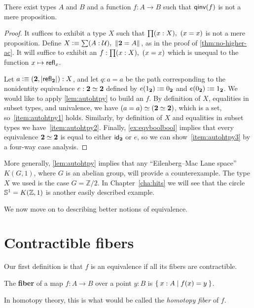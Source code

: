 \begin{thm}
  There exist types $A$ and $B$ and a function $f:A\to B$ such that $\qinv(f)$ is not a mere proposition.
\end{thm}
\begin{proof}
  It suffices to exhibit a type $X$ such that $\prd{x:X} (x=x)$ is not a mere proposition.
  Define $X\defeq \sm{A:\type} \brck{\bool=A}$, as in the proof of \autoref{thm:no-higher-ac}.
  It will suffice to exhibit an $f:\prd{x:X} (x=x)$ which is unequal to the function $x\mapsto \refl{x}$.

  Let $a \defeq (\bool,\bproj{\refl{\bool}}) : X$, and let $q:a=a$ be the path corresponding to the nonidentity equivalence $e:\eqv\bool\bool$ defined by $e(\btrue)\defeq\bfalse$ and $e(\bfalse)\defeq\btrue$.
  We would like to apply \autoref{lem:autohtpy} to build an $f$.
  By definition of $X$, equalities in subset types, and univalence, we have $\eqv{(a=a)}{(\eqv{\bool}{\bool})}$, which is a set, so~\ref{item:autohtpy1} holds.
  Similarly, by definition of $X$ and equalities in subset types we have~\ref{item:autohtpy2}.
  Finally, \autoref{ex:eqvboolbool} implies that every equivalence $\eqv\bool\bool$ is equal to either $\idfunc[\bool]$ or $e$, so we can show~\ref{item:autohtpy3} by a four-way case analysis.
\end{proof}

More generally, \autoref{lem:autohtpy} implies that any ``Eilenberg--Mac Lane space'' $K(G,1)$, where $G$ is an abelian group, will provide a counterexample.
The type $X$ we used is the case $G = \mathbb{Z}/2$.
In Chapter~\ref{cha:hits} we will see that the circle $\Sn^1 = K(\mathbb{Z},1)$ is another easily described example.

We now move on to describing better notions of equivalence.


\section{Contractible fibers}
\label{sec:contrf}

Our first definition is that $f$ is an equivalence if all its fibers are contractible.

\begin{defn}
  The \textbf{fiber} of a map $f:A\to B$ over a point $y:B$ is $\setof{x:A | f(x) = y}$.
\end{defn}

In homotopy theory, this is what would be called the \emph{homotopy fiber} of $f$.

